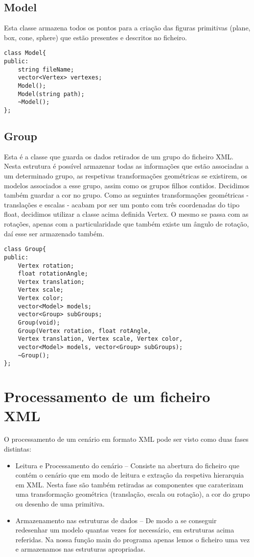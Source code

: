 \documentclass[12pt]{article}
\begin{document}
\subsection{Model}
Esta classe armazena todos os pontos para a criação das figuras primitivas (plane, box,
cone, sphere) que estão presentes e descritos no ficheiro.
\begin{lstlisting}
class Model{
public:
	string fileName;
	vector<Vertex> vertexes;
	Model();
	Model(string path);
	~Model();
};
\end{lstlisting}
\subsection{Group}
Esta é a classe que guarda os dados retirados de um grupo do ficheiro XML.
Nesta estrutura é possível armazenar todas as informações que estão associadas a um determinado grupo, as respetivas 
transformações geométricas se existirem, os modelos associados a esse grupo, assim como os grupos filhos contidos. Decidimos também
guardar a cor no grupo. Como as seguintes transformações geométricas - translações e escalas - acabam por ser um ponto com três coordenadas do tipo float,
decidimos utilizar a classe acima definida Vertex. O mesmo se passa com as rotações,
apenas com a particularidade que também existe um ângulo de rotação, daí esse ser armazenado também.
\begin{lstlisting}
class Group{
public:
	Vertex rotation;
	float rotationAngle;
	Vertex translation;
	Vertex scale;
	Vertex color;
	vector<Model> models;
	vector<Group> subGroups;
	Group(void);
	Group(Vertex rotation, float rotAngle,
	Vertex translation, Vertex scale, Vertex color, 
	vector<Model> models, vector<Group> subGroups);
	~Group();
};
\end{lstlisting}
\newpage
\section{Processamento de um ficheiro XML}
O processamento de um cenário em formato XML pode ser visto como duas fases
distintas:
\begin{itemize}
\item Leitura e Processamento do cenário – Consiste na abertura do ficheiro que contém o
cenário que em modo de leitura e extração da respetiva hierarquia em XML. Nesta
fase são também retiradas as componentes que caraterizam uma
transformação geométrica (translação, escala ou rotação), a cor do grupo ou desenho de uma
primitiva.
\item Armazenamento nas estruturas de dados – De modo a se conseguir redesenhar
um modelo quantas vezes for necessário, em estruturas acima referidas.
Na nossa função main do programa apenas lemos o ficheiro uma vez e armazenamos nas estruturas apropriadas.
\end{itemize}
\end{document}
